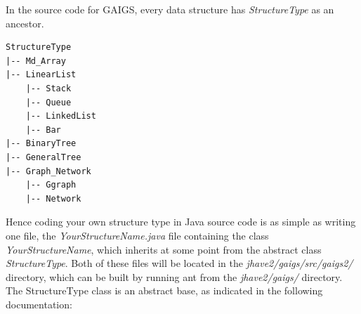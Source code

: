 \documentclass[11pt,letterpaper]{book}
\begin{document}
In the source code for GAIGS, every data structure has
\textit{StructureType} as an ancestor.

\small
\begin{verbatim}
StructureType 
|-- Md_Array     
|-- LinearList   
    |-- Stack       
    |-- Queue       
    |-- LinkedList                  
    |-- Bar                         
|-- BinaryTree                   
|-- GeneralTree        
|-- Graph_Network     
    |-- Ggraph           
    |-- Network          
\end{verbatim}
\normalsize


Hence coding your own structure type in Java source code is as simple
as writing one file, the \textit{YourStructureName.java} file
containing the class \textit{YourStructureName}, which inherits at
some point from the abstract class \textit{StructureType}. Both of
these files will be located in the \textit{jhave2/gaigs/src/gaigs2/}
directory, which can be built by running ant from the
\textit{jhave2/gaigs/} directory.  The StructureType class is an
abstract base, as indicated in the following documentation:
\end{document}
